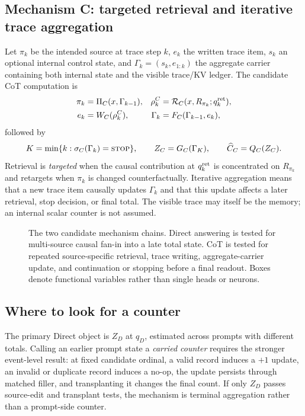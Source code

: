 \documentclass[11pt]{article}
\begin{document}
\subsection{Mechanism C: targeted retrieval and iterative trace aggregation}

Let $\pi_k$ be the intended source at trace step $k$, $e_k$ the written trace item, $s_k$ an optional internal control state, and $\Gamma_k=(s_k,e_{1:k})$ the aggregate carrier containing both internal state and the visible trace/KV ledger. The candidate CoT computation is
\begin{align}
\pi_k &= \Pi_C(x,\Gamma_{k-1}),
& \rho_k^C &= \mathcal R_C(x,R_{\pi_k};q_k^{\rm ret}),\\
e_k &= W_C(\rho_k^C),
& \Gamma_k &= F_C(\Gamma_{k-1},e_k),
\label{eq:cot-chain}
\end{align}
followed by
\begin{equation}
K=\min\{k:\sigma_C(\Gamma_k)=\textsc{stop}\},\qquad
Z_C=G_C(\Gamma_K),\qquad
\widehat C_C=Q_C(Z_C).
\label{eq:cot-readout}
\end{equation}
Retrieval is \emph{targeted} when the causal contribution at $q_k^{\rm ret}$ is concentrated on $R_{\pi_k}$ and retargets when $\pi_k$ is changed counterfactually. Iterative aggregation means that a new trace item causally updates $\Gamma_k$ and that this update affects a later retrieval, stop decision, or final total. The visible trace may itself be the memory; an internal scalar counter is not assumed.

\begin{figure}[H]
\centering
\resizebox{\textwidth}{!}{}
\caption{The two candidate mechanism chains. Direct answering is tested for multi-source causal fan-in into a late total state. CoT is tested for repeated source-specific retrieval, trace writing, aggregate-carrier update, and continuation or stopping before a final readout. Boxes denote functional variables rather than single heads or neurons.}
\label{fig:overview}
\end{figure}

\subsection{Where to look for a counter}

The primary Direct object is $Z_D$ at $q_D$, estimated across prompts with different totals. Calling an earlier prompt state a \emph{carried counter} requires the stronger event-level result: at fixed candidate ordinal, a valid record induces a $+1$ update, an invalid or duplicate record induces a no-op, the update persists through matched filler, and transplanting it changes the final count. If only $Z_D$ passes source-edit and transplant tests, the mechanism is terminal aggregation rather than a prompt-side counter.
\end{document}
